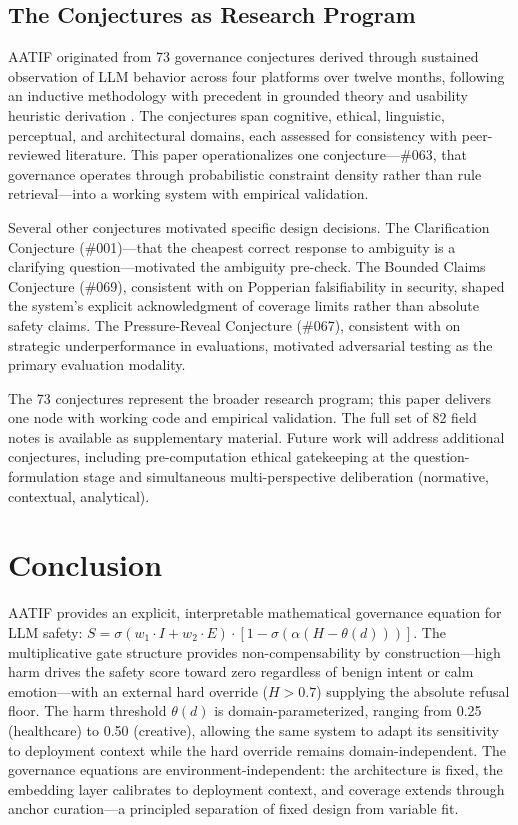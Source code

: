 \documentclass[11pt,a4paper]{article}
\begin{document}
\subsection{The Conjectures as Research Program}

AATIF originated from 73 governance conjectures derived through sustained observation of LLM behavior across four platforms over twelve months, following an inductive methodology with precedent in grounded theory \citep{glaser1967} and usability heuristic derivation \citep{nielsen1990}. The conjectures span cognitive, ethical, linguistic, perceptual, and architectural domains, each assessed for consistency with peer-reviewed literature. This paper operationalizes one conjecture---\#063, that governance operates through probabilistic constraint density rather than rule retrieval---into a working system with empirical validation.

Several other conjectures motivated specific design decisions. The Clarification Conjecture (\#001)---that the cheapest correct response to ambiguity is a clarifying question---motivated the ambiguity pre-check. The Bounded Claims Conjecture (\#069), consistent with \citet{herley2017} on Popperian falsifiability in security, shaped the system's explicit acknowledgment of coverage limits rather than absolute safety claims. The Pressure-Reveal Conjecture (\#067), consistent with \citet{vanderweij2024} on strategic underperformance in evaluations, motivated adversarial testing as the primary evaluation modality.

The 73 conjectures represent the broader research program; this paper delivers one node with working code and empirical validation. The full set of 82 field notes is available as supplementary material. Future work will address additional conjectures, including pre-computation ethical gatekeeping at the question-formulation stage and simultaneous multi-perspective deliberation (normative, contextual, analytical).


\section{Conclusion}
\label{sec:conclusion}

AATIF provides an explicit, interpretable mathematical governance equation for LLM safety: $S = \sigma(w_1 \cdot I + w_2 \cdot E) \cdot [1 - \sigma(\alpha(H - \theta(d)))]$. The multiplicative gate structure provides non-compensability by construction---high harm drives the safety score toward zero regardless of benign intent or calm emotion---with an external hard override ($H > 0.7$) supplying the absolute refusal floor. The harm threshold $\theta(d)$ is domain-parameterized, ranging from 0.25 (healthcare) to 0.50 (creative), allowing the same system to adapt its sensitivity to deployment context while the hard override remains domain-independent. The governance equations are environment-independent: the architecture is fixed, the embedding layer calibrates to deployment context, and coverage extends through anchor curation---a principled separation of fixed design from variable fit.
\end{document}
